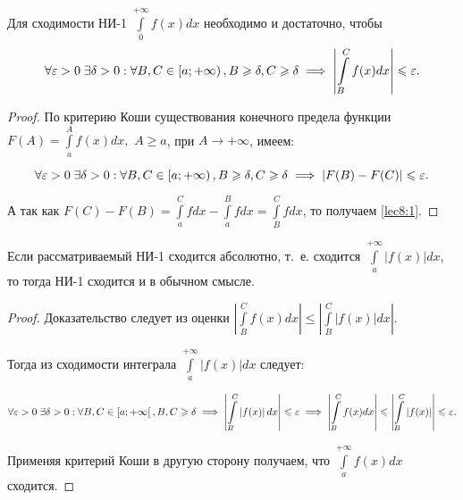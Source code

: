 \documentclass[../../main.tex]{subfiles}
\begin{document}
\begin {thm}
Для сходимости НИ-1 $\displaystyle \int\limits_{0}^{+\infty} f(x)dx$
необходимо и достаточно, чтобы 
 \begin{equation} \label{lec8:1}
  \forall \varepsilon > 0 \;  \exists \delta > 
  0 : \forall B, C \in \left[a; +\infty\right), B \geqslant \delta, C \geqslant \delta 
  \implies \left| \int\limits_{B}^{C} f(x)dx \right| \leqslant \varepsilon.
 \end{equation}
\end {thm}

\begin{proof}
По критерию Коши существования конечного предела функции
$F(A) = \displaystyle\int\limits_{a}^{A}f(x)dx,$ $A \geq a$, при $A \to 
+\infty$, имеем:
 
 \[\forall \varepsilon > 0 \; \exists \delta > 0 : \forall B, C \in \left[a; +\infty 
 \right), B \geqslant \delta, C \geqslant \delta \implies \left|F(B) - F(C) \right| \leqslant 
 \varepsilon.\]
 
 А так как
 $F(C) - F(B) = \displaystyle\int\limits_{a}^{C}fdx - 
 \displaystyle\int\limits_{a}^{B}fdx = \int\limits_{B}^{C}fdx$,
 то получаем \eqref{lec8:1}.
\end{proof}

\begin{crl}
 Если рассматриваемый НИ-1 сходится абсолютно, т.~е. сходится
 $\displaystyle\int\limits_{a}^{+\infty}|f(x)|dx$, то тогда НИ-1 сходится и в 
 обычном смысле.
\end{crl}

 \begin{proof}
 Доказательство следует из оценки
$\left|\displaystyle\int\limits_{B}^{C}f(x)dx \right| \leq 
\left|\displaystyle\int\limits_{B}^{C}|f(x)|dx \right|$.

Тогда из сходимости интеграла $\displaystyle\int\limits_{a}^{+\infty}\left| 
f(x) \right| dx $ следует:

\[\forall \varepsilon > 0 \; \exists \delta > 0 : \forall B, C \in \left[a; +\infty 
\right[, B, C \geqslant \delta \implies \left| \int\limits_{B}^{C} \left| f(x) 
\right| dx \right| \leqslant \varepsilon \implies \left| \int\limits_{B}^{C} f(x) dx 
\right| \leqslant \left|\int\limits_{B}^{C} \left| f(x) \right| \right| \leqslant \varepsilon.\]

Применяя критерий Коши в другую сторону получаем, что 
$\displaystyle\int\limits_{a}^{+\infty}f(x)dx$ сходится.
 \end{proof}
\end{document}
